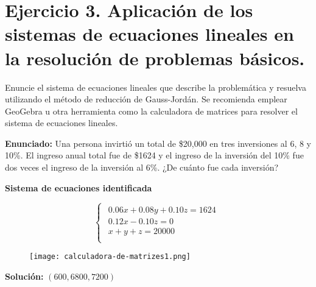\section{\large Ejercicio 3. Aplicación de los sistemas de ecuaciones lineales en la resolución de problemas básicos.}

Enuncie el sistema de ecuaciones lineales que describe la problemática y resuelva utilizando el método de reducción de Gauss-Jordán. Se recomienda emplear GeoGebra u otra herramienta como la calculadora de matrices para resolver el sistema de ecuaciones lineales. 

\textbf{Enunciado:} Una persona invirtió un total de \$20,000 en tres inversiones al 6, 8 y 10\%. El ingreso anual total fue de \$1624 y el ingreso de la inversión del 10\% fue dos veces el ingreso de la inversión al 6\%. ¿De cuánto fue cada inversión?

\begin{center}
    \textbf{Sistema de ecuaciones identificada}
\end{center}

\[
    \begin{cases}
        \begin{array}{l}
            0.06x+0.08y+0.10z=1624 \\
            0.12x-0.10z=0 \\
            x+y+z=20000 \\    
        \end{array}
    \end{cases}
\]

\begin{figure}[ht!]
    \texttt{[image: calculadora-de-matrizes1.png]}
\end{figure}

\begin{center}
    \textbf{Solución:} \(\left(600,6800,7200\right)\)
\end{center}